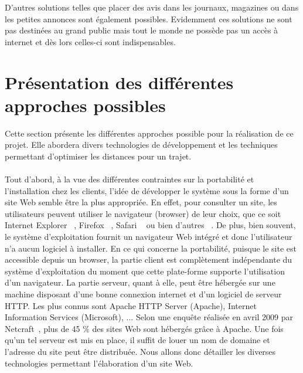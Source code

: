 \documentclass[12pt, a4paper, oneside]{article}
\begin{document}
    \indent D'autres solutions telles que placer des avis dans les journaux, magazines ou dans les petites annonces sont également possibles. Evidemment ces solutions ne sont pas destinées au grand public mais tout le monde ne possède pas un accès à internet et dès lors celles-ci sont indispensables.
\section{Présentation des différentes approches possibles}\label{approches}
    Cette section présente les différentes approches possible pour la réalisation de ce projet. Elle abordera divers technologies de développement et les techniques permettant d'optimiser les distances pour un trajet.\\\\
    \indent Tout d'abord, à la vue des différentes contraintes sur la portabilité et l'installation chez les clients, l'idée de développer le système sous la forme d'un site Web semble être la plus appropriée. En effet, pour consulter un site, les utilisateurs peuvent utiliser le navigateur (browser) de leur choix, que ce soit Internet Explorer ~\cite{internet-explorer}, Firefox ~\cite{firefox}, Safari ~\cite{safari} ou bien d'autres ~\cite{browser-list}. De plus, bien souvent, le système d'exploitation fournit un navigateur Web intégré et donc l'utilisateur n'a aucun logiciel à installer. En ce qui concerne la portabilité, puisque le site est accessible depuis un browser, la partie client est complètement indépendante du système d'exploitation du moment que cette plate-forme supporte l'utilisation d'un navigateur. La partie serveur, quant à elle, peut être hébergée sur une machine disposant d'une bonne connexion internet et d'un logiciel de serveur HTTP. Les plus connus sont Apache HTTP Server (Apache), Internet Information Services (Microsoft), ... Selon une enquête réalisée en avril 2009 par Netcraft~\cite{server-survey}, plus de 45 $\%$ des sites Web sont hébergés grâce à Apache. Une fois qu'un tel serveur est mis en place, il suffit de louer un nom de domaine et l'adresse du site peut être distribuée. Nous allons donc détailler les diverses technologies permettant l'élaboration d'un site Web.\\\\
\end{document}
